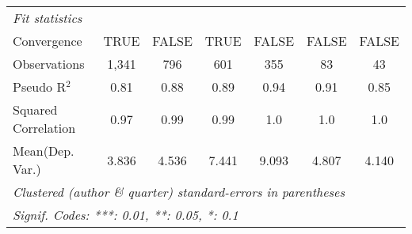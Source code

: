 \begin{tabular}{lcccccc}
   \midrule
   \emph{Fit statistics}\\
   Convergence                                                &TRUE           & FALSE        & TRUE         & FALSE       & FALSE   & FALSE\\  
   Observations                                               & 1,341         & 796          & 601          & 355         & 83      & 43\\  
   Pseudo R$^2$                                               & 0.81          & 0.88         & 0.89         & 0.94        & 0.91    & 0.85\\  
   Squared Correlation                                        & 0.97          & 0.99         & 0.99         & 1.0         & 1.0     & 1.0\\  
Mean(Dep. Var.) & 3.836 & 4.536 & 7.441 & 9.093 & 4.807 & 4.140 \\
   \midrule \midrule
   \multicolumn{7}{l}{\emph{Clustered (author \& quarter) standard-errors in parentheses}}\\
   \multicolumn{7}{l}{\emph{Signif. Codes: ***: 0.01, **: 0.05, *: 0.1}}\\
\end{tabular}
\par\endgroup
